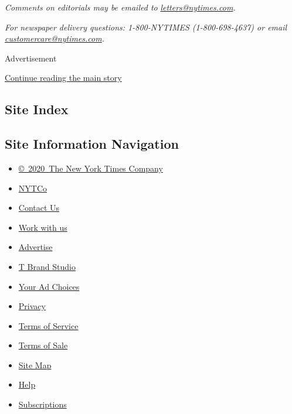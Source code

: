 \emph{Comments on editorials may be emailed to}
\href{mailto:letters@nytimes.com}{\emph{letters@nytimes.com}}\emph{.}

\emph{For newspaper delivery questions: 1-800-NYTIMES (1-800-698-4637)
or email}
\href{mailto:customercare@nytimes.com}{\emph{customercare@nytimes.com}}\emph{.}

Advertisement

\protect\hyperlink{after-bottom}{Continue reading the main story}

\hypertarget{site-index}{%
\subsection{Site Index}\label{site-index}}

\hypertarget{site-information-navigation}{%
\subsection{Site Information
Navigation}\label{site-information-navigation}}

\begin{itemize}
\tightlist
\item
  \href{https://help.nytimes.com/hc/en-us/articles/115014792127-Copyright-notice}{©~2020~The
  New York Times Company}
\end{itemize}

\begin{itemize}
\tightlist
\item
  \href{https://www.nytco.com/}{NYTCo}
\item
  \href{https://help.nytimes.com/hc/en-us/articles/115015385887-Contact-Us}{Contact
  Us}
\item
  \href{https://www.nytco.com/careers/}{Work with us}
\item
  \href{https://nytmediakit.com/}{Advertise}
\item
  \href{http://www.tbrandstudio.com/}{T Brand Studio}
\item
  \href{https://www.nytimes.com/privacy/cookie-policy\#how-do-i-manage-trackers}{Your
  Ad Choices}
\item
  \href{https://www.nytimes.com/privacy}{Privacy}
\item
  \href{https://help.nytimes.com/hc/en-us/articles/115014893428-Terms-of-service}{Terms
  of Service}
\item
  \href{https://help.nytimes.com/hc/en-us/articles/115014893968-Terms-of-sale}{Terms
  of Sale}
\item
  \href{https://spiderbites.nytimes.com}{Site Map}
\item
  \href{https://help.nytimes.com/hc/en-us}{Help}
\item
  \href{https://www.nytimes.com/subscription?campaignId=37WXW}{Subscriptions}
\end{itemize}
